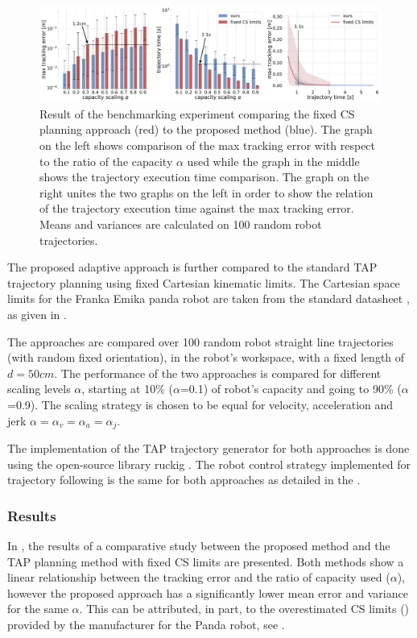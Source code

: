 \begin{figure}[!t]
    \centering
    \includegraphics[width=\linewidth]{Papers/imgs/comparison_fixed_cs.pdf}
    \caption{Result of the benchmarking experiment comparing the fixed CS planning approach (red) to the proposed method (blue). The graph on the left shows comparison of the max tracking error with respect to the ratio of the capacity $\alpha$ used while the graph in the middle shows the trajectory execution time comparison. The graph on the right unites the two graphs on the left in order to show the relation of the trajectory execution time against the max tracking error. Means and variances are calculated on 100 random robot trajectories. }
    \label{fig:comp_fixed_cs}
\end{figure}
The proposed adaptive approach is further compared to the standard TAP trajectory planning using fixed Cartesian kinematic limits. The Cartesian space limits for the Franka Emika panda robot are taken from the standard datasheet \cite{frankadata}, as given in .

The approaches are compared over 100 random robot straight line trajectories (with random fixed orientation), in the robot's workspace, with a fixed length of $d=50cm$. The performance of the two approaches is compared for different scaling levels $\alpha$, starting at 10\% ($\alpha$=0.1) of robot's capacity and going to 90\% ($\alpha$=0.9). The scaling strategy is chosen to be equal for velocity, acceleration and jerk $\alpha\!=\!\alpha_v\!=\!\alpha_a\!=\!\alpha_j$. 



The implementation of the TAP trajectory generator for both approaches is done using the open-source library ruckig \cite{ruckig}. The robot control strategy implemented for trajectory following is the same for both approaches as detailed in the .

\subsubsection*{Results} In , the results of a comparative study between the proposed method and the TAP planning method with fixed CS limits are presented. Both methods show a linear relationship between the tracking error and the ratio of capacity used ($\alpha$), however the proposed approach has a significantly lower mean error and variance for the same $\alpha$. This can be attributed, in part, to the overestimated CS limits () provided by the manufacturer for the Panda robot, see .


